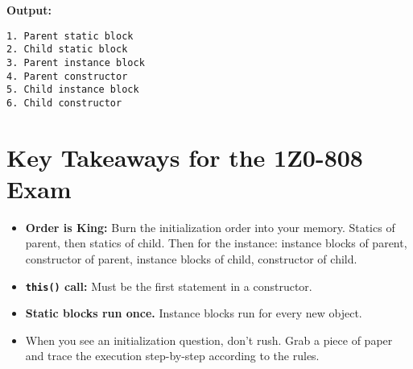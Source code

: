 \documentclass[12pt]{article}
\begin{document}
\begin{enumerate}[label=(\arabic*)]
\textbf{Output:}
\begin{verbatim}
1. Parent static block
2. Child static block
3. Parent instance block
4. Parent constructor
5. Child instance block
6. Child constructor
\end{verbatim}

\section{Key Takeaways for the 1Z0-808 Exam}
\begin{itemize}
    \item \textbf{Order is King:} Burn the initialization order into your memory. Statics of parent, then statics of child. Then for the instance: instance blocks of parent, constructor of parent, instance blocks of child, constructor of child.
    \item \textbf{\texttt{this()} call:} Must be the first statement in a constructor.
    \item \textbf{Static blocks run once.} Instance blocks run for every new object.
    \item When you see an initialization question, don't rush. Grab a piece of paper and trace the execution step-by-step according to the rules.
\end{itemize}
\end{enumerate}
\end{document}
